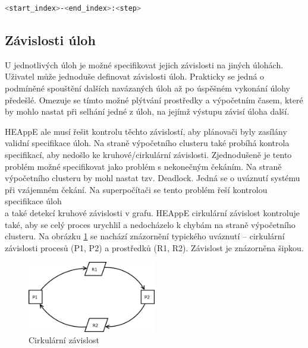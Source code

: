 \begin{lstlisting}[language=bash,caption={Struktura definice JobArrays}]
                            <start_index>-<end_index>:<step>
\end{lstlisting}

\subsection{Závislosti úloh}
U jednotlivých úloh je možné specifikovat jejich závislosti na jiných úlohách. Uživatel může jednoduše definovat závislosti úloh. Prakticky se jedná o podmíněné spouštění dalších navázaných úloh až po úspěšném vykonání úlohy předešlé. Omezuje se tímto možné plýtvání prostředky a výpočetním časem, které by mohlo nastat při selhání jedné z úloh, na jejímž výstupu závisí úloha další.

HEAppE ale musí řešit kontrolu těchto závislostí, aby plánovači byly zasílány validní specifikace úloh. Na straně výpočetního clusteru také probíhá kontrola specifikací, aby nedošlo ke kruhové/cirkulární závislosti. Zjednodušeně je tento problém možné specifikovat jako problém s nekonečným čekáním. Na straně výpočetního clusteru by mohl nastat tzv. Deadlock. Jedná se o uváznutí systému při vzájemném čekání. Na superpočítači se tento problém řeší kontrolou specifikace úloh \\a také detekcí kruhové závislosti v grafu. HEAppE cirkulární závislost kontroluje také, aby se celý proces urychlil a nedocházelo k chybám na straně výpočetního clusteru. Na obrázku \ref{fig:cirkularni-zavislost} se nachází znázornění typického uváznutí – cirkulární závislosti procesů (P1, P2) a prostředků (R1, R2). Závislost je znázorněna šipkou.


\begin{figure}[!h]
	\centering
	\includegraphics[width=0.5\textwidth]{Figures/Process_deadlock.png}
	\caption{Cirkulární závislost \cite{OvBwjLleECKerU0E}}
	\label{fig:cirkularni-zavislost}
\end{figure}

